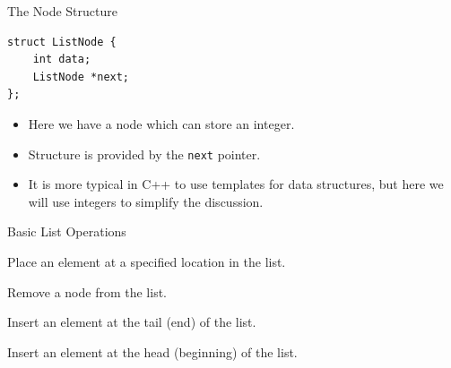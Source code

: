 \documentclass{beamer}
\begin{document}
\begin{frame}[fragile]{The Node Structure}
    \begin{verbatim}
struct ListNode {
    int data;
    ListNode *next;
};
    \end{verbatim}
    \begin{itemize}[<+->]
        \item Here we have a node which can store an integer.
        \item Structure is provided by the {\tt next} pointer.
        \item It is more typical in C++ to use templates for data structures, but here we will use integers to simplify the discussion. 
    \end{itemize}
\end{frame}

\begin{frame}{Basic List Operations}
   \begin{description}[<+->]
       \item[insert] Place an element at a specified location in the list.
       \item[remove] Remove a node from the list.
       \item[append] Insert an element at the tail (end) of the list.
       \item[prepend] Insert an element at the head (beginning) of the list.
   \end{description}
\end{frame}
\end{document}
